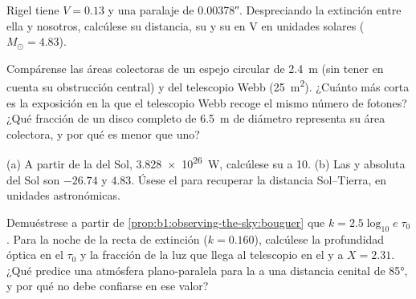 \begin{exercise}[$\star\star$]\label{exo:b1:observing-the-sky:7}
Rigel tiene $V = 0.13$ y una paralaje de \ang{;;0.00378}. Despreciando la extinción entre
ella y nosotros, calcúlese su distancia, su  y su  en V en
unidades solares ($M_\odot = 4.83$).
\end{exercise}

\begin{exercise}[$\star\star$]\label{exo:b1:observing-the-sky:8}
Compárense las áreas colectoras de un espejo circular de \qty{2.4}{m} (sin tener en cuenta
su obstrucción central) y del telescopio Webb (\qty{25}{m^2}). ¿Cuánto más corta es la
exposición en la que el telescopio Webb recoge el mismo número de fotones? ¿Qué fracción de
un disco completo de \qty{6.5}{m} de diámetro representa su área colectora, y por qué es
menor que uno?
\end{exercise}

\begin{exercise}[$\star\star$]\label{exo:b1:observing-the-sky:9}
(a) A partir de la  del Sol, \qty{3.828e26}{W}, calcúlese su  a
\qty{10}{\parsec}. (b) Las  y absoluta del Sol son $-26.74$ y $4.83$.
Úsese el  para recuperar la distancia Sol--Tierra, en unidades
astronómicas.
\end{exercise}

\begin{exercise}[$\star\star\star$]\label{exo:b1:observing-the-sky:10}
Demuéstrese a partir de \cref{prop:b1:observing-the-sky:bouguer} que $k =
2.5\log_{10}e\;\tau_0$. Para la noche de la recta de extinción ($k =
\num{0.160}$), calcúlese la profundidad óptica en el  $\tau_0$ y la fracción de la luz
que llega al telescopio en el  y a $X = 2.31$. ¿Qué predice una atmósfera
plano-paralela para la  a una distancia cenital de \ang{85}, y por qué no debe
confiarse en ese valor?
\end{exercise}

